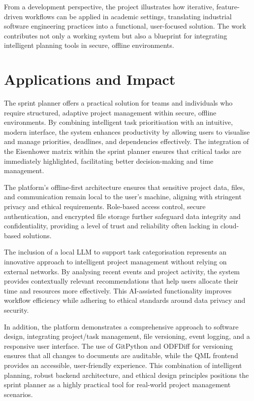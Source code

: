 \documentclass{report}
\begin{document}
From a development perspective, the project illustrates how iterative, feature-driven workflows can be applied in academic settings, translating industrial software engineering practices into a functional, user-focused solution. The work contributes not only a working system but also a blueprint for integrating intelligent planning tools in secure, offline environments.
\section{Applications and Impact}
The sprint planner offers a practical solution for teams and individuals who require structured, adaptive project management within secure, offline environments. By combining intelligent task prioritisation with an intuitive, modern interface, the system enhances productivity by allowing users to visualise and manage priorities, deadlines, and dependencies effectively. The integration of the Eisenhower matrix within the sprint planner ensures that critical tasks are immediately highlighted, facilitating better decision-making and time management.

The platform's offline-first architecture ensures that sensitive project data, files, and communication remain local to the user's machine, aligning with stringent privacy and ethical requirements. Role-based access control, secure authentication, and encrypted file storage further safeguard data integrity and confidentiality, providing a level of trust and reliability often lacking in cloud-based solutions.

The inclusion of a local LLM to support task categorisation represents an innovative approach to intelligent project management without relying on external networks. By analysing recent events and project activity, the system provides contextually relevant recommendations that help users allocate their time and resources more effectively. This AI-assisted functionality improves workflow efficiency while adhering to ethical standards around data privacy and security.

In addition, the platform demonstrates a comprehensive approach to software design, integrating project/task management, file versioning, event logging, and a responsive user interface. The use of GitPython and ODFDiff for versioning ensures that all changes to documents are auditable, while the QML frontend provides an accessible, user-friendly experience. This combination of intelligent planning, robust backend architecture, and ethical design principles positions the sprint planner as a highly practical tool for real-world project management scenarios.
\end{document}
